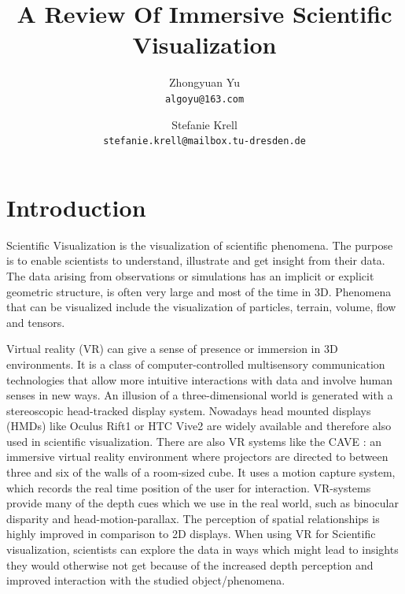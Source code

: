 \documentclass[10pt,twocolumn,letterpaper]{article}
\begin{document}
\title{A Review Of Immersive Scientific Visualization}

\author{Zhongyuan Yu\\
{\tt\small algoyu@163.com}
\and
Stefanie Krell\\
{\tt\small stefanie.krell@mailbox.tu-dresden.de}
}

\maketitle


\section{Introduction}
Scientific Visualization is the visualization of scientific phenomena. The purpose is to enable scientists to understand, illustrate and get insight from their data. The data arising from observations or simulations has an implicit or explicit geometric structure, is often very large and most of the time in 3D. Phenomena that can be visualized include the visualization of particles, terrain, volume, flow and tensors.

\setlength{\parindent}{1pc}Virtual reality (VR) can give a sense of presence or immersion in 3D environments. It is a class of computer-controlled multisensory communication technologies that allow more intuitive interactions with data and involve human senses in new ways. An illusion of a three-dimensional world is generated with a stereoscopic head-tracked display system. Nowadays head mounted displays (HMDs) like Oculus Rift1 or HTC Vive2 are widely available and therefore also used in scientific visualization. There are also VR systems like the CAVE \cite{cruz1992cave}: an immersive virtual reality environment where projectors are directed to between three and six of the walls of a room-sized cube. It uses a motion capture system, which records the real time position of the user for interaction. VR-systems provide many of the depth cues which we use in the real world, such as binocular disparity and head-motion-parallax. The perception of spatial relationships is highly improved in comparison to 2D displays. When using VR for Scientific visualization, scientists can explore the data in ways which might lead to insights they would otherwise not get because of the increased depth perception and improved interaction with the studied object/phenomena. 
\end{document}
